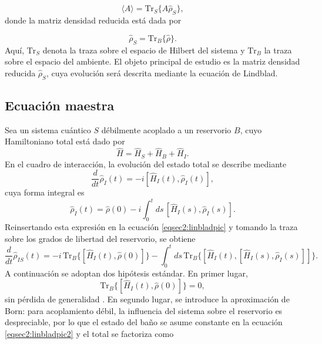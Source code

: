 \begin{equation*}
    \langle A \rangle = \text{Tr}_{S}\{A \hat{\rho}_{S} \},
\end{equation*}
donde la matriz densidad reducida está dada por

\begin{equation*}
    \hat{\rho}_{S} = \text{Tr}_{B}\{ \hat{\rho} \}.
\end{equation*}
Aquí, $\text{Tr}_{S}$ denota la traza sobre el espacio de Hilbert del sistema y $\text{Tr}_{B}$ la traza sobre el espacio del ambiente. El objeto principal de estudio es la matriz densidad reducida $\hat{\rho}_{S}$, cuya evolución será descrita mediante la ecuación de Lindblad.

\subsection{Ecuación maestra}
Sea un sistema cuántico $S$ débilmente acoplado a un reservorio $B$, cuyo Hamiltoniano total está dado por
\begin{equation*}
    \hat{H} = \hat{H}_{S} + \hat{H}_{B} + \hat{H}_{I}.
\end{equation*}
En el cuadro de interacción, la evolución del estado total se describe mediante
\begin{equation}
    \frac{d}{dt}\hat{\rho}_{I}(t) = -i[\hat{H}_{I}(t), \hat{\rho}_{I}(t)],
    \label{eqsec2:linbladpic}
\end{equation}
cuya forma integral es
\begin{equation*}
    \hat{\rho}_{I}(t) = \hat{\rho}(0) - i \int_{0}^{t} ds \,[\hat{H}_{I}(s), \hat{\rho}_{I}(s)].
\end{equation*}
Reinsertando esta expresión en la ecuación \eqref{eqsec2:linbladpic} y tomando la traza sobre los grados de libertad del reservorio, se obtiene
\begin{equation}
    \frac{d}{dt}\hat{\rho}_{IS}(t) = -i \,\text{Tr}_{B}\{[\hat{H}_{I}(t), \hat{\rho}(0)] \}  
    - \int_{0}^{t} ds \,\text{Tr}_{B}\{[\hat{H}_{I}(t), [\hat{H}_{I}(s), \hat{\rho}_{I}(s)]]\}.
\label{eqsec2:linbladpic2}
\end{equation}
A continuación se adoptan dos hipótesis estándar. En primer lugar,
\[
\text{Tr}_{B}\{[\hat{H}_{I}(t), \hat{\rho}(0)] \}=0,
\]
sin pérdida de generalidad \cite{breuer2002theory}. En segundo lugar, se introduce la aproximación de Born: para acoplamiento débil, la influencia del sistema sobre el reservorio es despreciable, por lo que el estado del baño se asume constante en la ecuación \eqref{eqsec2:linbladpic2} y el total se factoriza como
